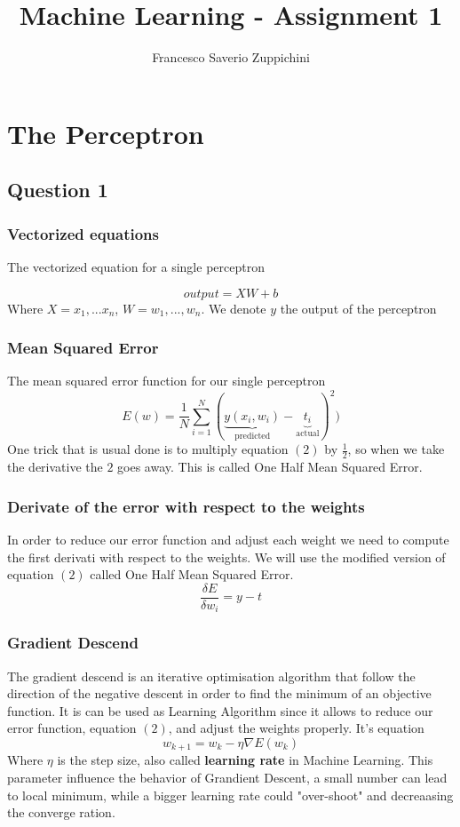 \documentclass[11pt]{article}
\author{Francesco Saverio Zuppichini}
\title{Machine Learning - Assignment 1}
\begin{document}
\maketitle

\section{The Perceptron}
\subsection{Question 1}
\subsubsection{Vectorized equations}
The vectorized equation for a single perceptron

\begin{equation}
output = XW + b
\end{equation}
Where $X = {x_1, ... x_n}$, $W = {w_1, ..., w_n}$. We denote $y$ the output of the perceptron

\subsubsection{Mean Squared Error}
The mean squared error function for our single perceptron
\begin{equation}
	E(w) = \frac{1}{N}\sum_{i = 1}^N(\underbrace{y(x_i,w_i)}_{\text{predicted}} - \underbrace{t_i}_{\text{actual}})^2)
\end{equation}
One trick that is usual done is to multiply equation $(2)$ by $\frac{1}{2}$, so when we take the derivative the $2$ goes away. This is called One Half Mean Squared Error.

\subsubsection{Derivate of the error with respect to the weights}
In order to reduce our error function and adjust each weight we need to compute the first derivati with respect to the weights. We will use the modified version of equation $(2)$ called One Half Mean Squared Error.
\begin{equation}
\frac{\delta E}{\delta w_i}	= y - t
\end{equation}
\subsubsection{Gradient Descend}
The gradient descend is an iterative optimisation algorithm that follow the direction of the negative descent in order to find the minimum of an objective function. It is can be used as Learning Algorithm since it allows to reduce our error function, equation $(2)$, and adjust the weights properly.
It's equation
\begin{equation}
	w_{k + 1} = w_k - \eta \nabla E(w_k)
\end{equation}
Where $\eta$ is the step size, also called \textbf{learning rate} in Machine Learning. This parameter influence the behavior of Grandient Descent, a small number can lead to local minimum, while a bigger learning rate could "over-shoot" and decreaasing the converge ration. 
\end{document}

